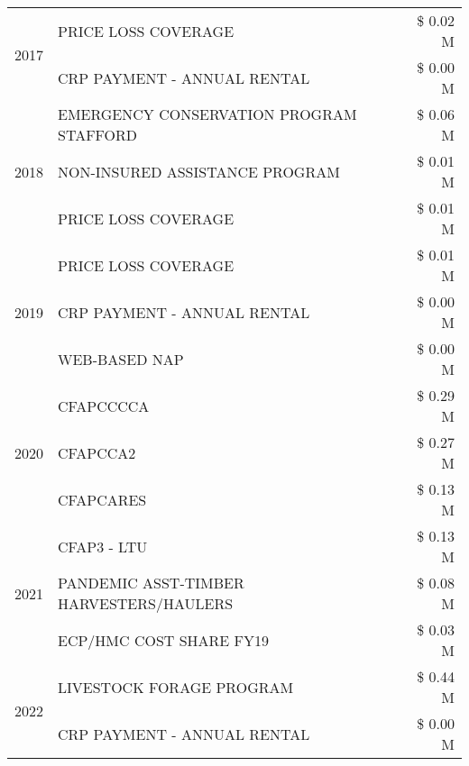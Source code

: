\begin{tabular}{llr}
\cline{1-3}
\multirow[t]{2}{*}{2017} & PRICE LOSS COVERAGE & \$ 0.02 M \\
 & CRP PAYMENT - ANNUAL RENTAL & \$ 0.00 M \\
\cline{1-3}
\multirow[t]{3}{*}{2018} & EMERGENCY CONSERVATION PROGRAM STAFFORD & \$ 0.06 M \\
 & NON-INSURED ASSISTANCE PROGRAM & \$ 0.01 M \\
 & PRICE LOSS COVERAGE & \$ 0.01 M \\
\cline{1-3}
\multirow[t]{3}{*}{2019} & PRICE LOSS COVERAGE & \$ 0.01 M \\
 & CRP PAYMENT - ANNUAL RENTAL & \$ 0.00 M \\
 & WEB-BASED NAP & \$ 0.00 M \\
\cline{1-3}
\multirow[t]{3}{*}{2020} & CFAPCCCCA & \$ 0.29 M \\
 & CFAPCCA2 & \$ 0.27 M \\
 & CFAPCARES & \$ 0.13 M \\
\cline{1-3}
\multirow[t]{3}{*}{2021} & CFAP3 - LTU & \$ 0.13 M \\
 & PANDEMIC ASST-TIMBER HARVESTERS/HAULERS & \$ 0.08 M \\
 & ECP/HMC COST SHARE FY19 & \$ 0.03 M \\
\cline{1-3}
\multirow[t]{2}{*}{2022} & LIVESTOCK FORAGE PROGRAM & \$ 0.44 M \\
 & CRP PAYMENT - ANNUAL RENTAL & \$ 0.00 M \\
\cline{1-3}
\bottomrule
\end{tabular}

